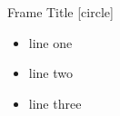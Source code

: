 \documentclass{beamer}
\begin{document}
\begin{frame}{Frame Title}
[circle]
\addtolength{\leftmargini}{-0.7cm}
\begin{itemize}[<+-|gray@+>]
\setlength\itemsep{5pt plus 1fill}
\item line one
\item line two
\item line three
\end{itemize}
\end{frame}
\end{document}
